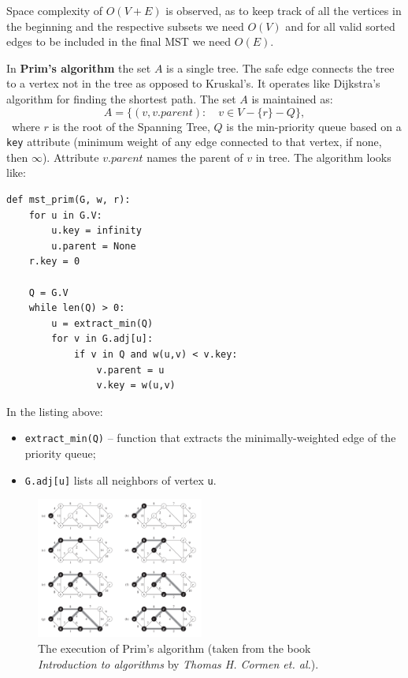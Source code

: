 \documentclass[12pt, a4paper]{article}
\begin{document}
Space complexity of $O(V+E)$ is observed, as to keep track of all the vertices in the beginning and the respective subsets we need $O(V)$ and for all valid sorted edges to be included in the final MST we need $O(E)$.

\newpage

In \textbf{Prim's algorithm} the set $A$ is a single tree. The safe edge connects the tree to a vertex not in the tree as opposed to Kruskal's. It operates like Dijkstra's algorithm for finding the shortest path. The set $A$ is maintained as:
\[ A = \big\{ (v, v.parent) : \quad v \in V - \{ r \} - Q \big\}, \]\
where $r$ is the root of the Spanning Tree, $Q$ is the min-priority queue based on a \texttt{key} attribute (minimum weight of any edge connected to that vertex, if none, then $\infty$). Attribute $v.parent$ names the parent of $v$ in tree.
The algorithm looks like:
\begin{Verbatim}
def mst_prim(G, w, r):
	for u in G.V:
		u.key = infinity
		u.parent = None
	r.key = 0

	Q = G.V
	while len(Q) > 0:
		u = extract_min(Q)
		for v in G.adj[u]:
			if v in Q and w(u,v) < v.key:
				v.parent = u
				v.key = w(u,v)
\end{Verbatim}
In the listing above:
\begin{itemize}
	\item \texttt{extract\_min(Q)} -- function that extracts the minimally-weighted edge of the priority queue;
	\item \texttt{G.adj[u]} lists all neighbors of vertex \texttt{u}.
\end{itemize}

\begin{figure}
\centering
\includegraphics[width=0.49\textwidth]{prim.png}
\caption{The execution of Prim's algorithm (taken from the book \textit{Introduction to algorithms} by \textit{Thomas H. Cormen et. al.}).}
\end{figure}
\end{document}
